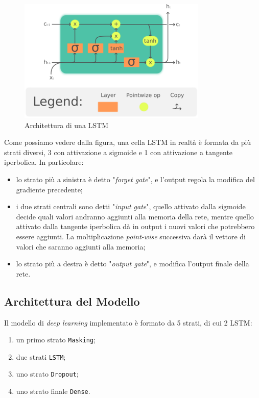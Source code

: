 \documentclass[8pt,notitlepage]{report}
\begin{document}
		\begin{figure}[H]
			\begin{center}
				\includegraphics[scale=2.2]{lstm}
				\caption{Architettura di una LSTM}
			\end{center}
		\end{figure}		
		
		Come possiamo vedere dalla figura, una cella LSTM in realtà è formata da più strati diversi, 3 con attivazione a sigmoide e 1 con attivazione a tangente iperbolica.
		In particolare:
		\begin{itemize}
			\item lo strato più a sinistra è detto "\textit{forget gate}", e l'output regola la modifica del gradiente precedente;
			\item i due strati centrali sono detti "\textit{input gate}", quello attivato dalla sigmoide decide quali valori andranno aggiunti alla memoria della rete, mentre quello attivato dalla tangente iperbolica dà in output i nuovi valori che potrebbero essere aggiunti. La moltiplicazione \textit{point-wise} successiva darà il vettore di valori che saranno aggiunti alla memoria; 
			\item lo strato più a destra è detto "\textit{output gate}", e modifica l'output finale della rete.
		\end{itemize}
		
		\subsection{Architettura del Modello}
			Il modello di \textit{deep learning} implementato è formato da 5 strati, di cui 2 LSTM:
			\begin{enumerate}
				\item un primo strato \verb|Masking|;
				\item due strati \verb|LSTM|;
				\item uno strato \verb|Dropout|;
				\item uno strato finale \verb|Dense|.
			\end{enumerate}
			
\end{document}
